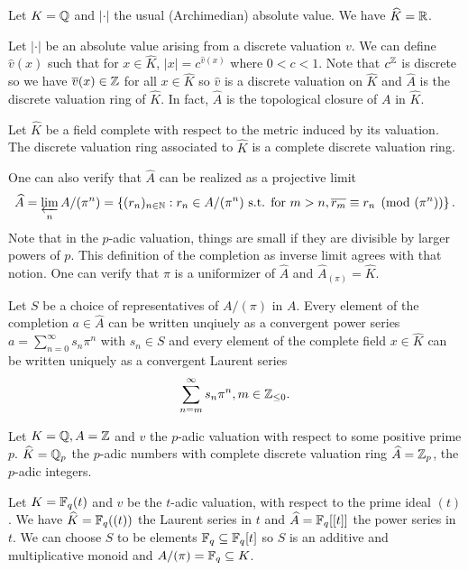 \begin{example}
  Let $K=\mathbb{Q}$ and $|\cdot|$ the usual (Archimedian) absolute value. We have $\widehat{K}=\mathbb{R}$. 
\end{example}
\begin{example}
  Let $|\cdot|$ be an absolute value arising from a discrete valuation $v$. We can define $\widehat{v}(x)$ such that for $x\in\widehat{K}$, $|x|=c^{\widehat{v}(x)}$ where $0<c<1$. Note that $c^{\mathbb{Z}}$ is discrete so we have $\overline{v}(x)\in\mathbb{Z}$ for all $x\in\widehat{K}$ so $\widehat{v}$ is a discrete valuation on $\widehat{K}$ and $\widehat{A}$ is the discrete valuation ring of $\widehat{K}$. In fact, $\widehat{A}$ is the topological closure of $A$ in $\widehat{K}$. 
\end{example}
\begin{definition}\label{def: complete DVR}
  Let $\widehat{K}$ be a field complete with respect to the metric induced by its valuation. The discrete valuation ring associated to $\widehat{K}$ is a complete discrete valuation ring. 
\end{definition}
One can also verify that $\widehat{A}$ can be realized as a projective limit 
$$\widehat{A}=\varprojlim_{n}A/(\pi^{n})=\left\{(r_{n})_{n\in\mathbb{N}}:r_{n}\in A/(\pi^{n}) \text{ s.t. for }m>n, \overline{r_{m}}\equiv r_{n}\pmod{(\pi^{n})}\right\}.$$
Note that in the $p$-adic valuation, things are small if they are divisible by larger powers of $p$. This definition of the completion as inverse limit agrees with that notion. One can verify that $\pi$ is a uniformizer of $\widehat{A}$ and $\widehat{A}_{(\pi)}=\widehat{K}$. 
\begin{proposition}
  Let $S$ be a choice of representatives of $A/(\pi)$ in $A$. Every element of the completion $a\in\widehat{A}$ can be written unqiuely as a convergent power series $a=\sum_{n=0}^{\infty}s_{n}\pi^{n}$ with $s_{n}\in S$
  and every element of the complete field $x\in\widehat{K}$ can be written uniquely as a convergent Laurent series
  $$\sum_{n=m}^{\infty}s_{n}\pi^{n}, m\in\mathbb{Z}_{\leq0}.$$
\end{proposition}
\begin{example}
  Let $K=\mathbb{Q}, A=\mathbb{Z}$ and $v$ the $p$-adic valuation with respect to some positive prime $p$. $\widehat{K}=\mathbb{Q}_{p}$ the $p$-adic numbers with complete discrete valuation ring $\widehat{A}=\mathbb{Z}_{p}$, the $p$-adic integers. 
\end{example}
\begin{example}
  Let $K=\mathbb{F}_{q}(t)$ and $v$ be the $t$-adic valuation, with respect to the prime ideal $(t)$. We have $\widehat{K}=\mathbb{F}_{q}((t))$ the Laurent series in $t$ and $\widehat{A}=\mathbb{F}_{q}[[t]]$ the power series in $t$. We can choose $S$ to be elements $\mathbb{F}_{q}\subseteq\mathbb{F}_{q}[t]$ so $S$ is an additive and multiplicative monoid and $A/(\pi)=\mathbb{F}_{q}\subseteq K$. 
\end{example}
